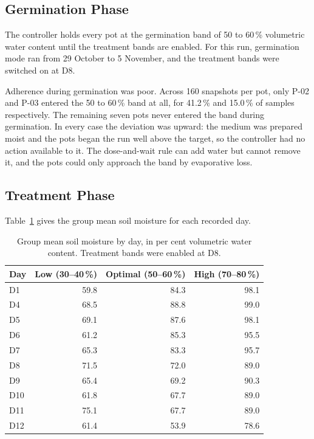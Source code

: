 \subsection{Germination Phase}

The controller holds every pot at the germination band of 50 to 60\,\%
volumetric water content until the treatment bands are enabled. For this run,
germination mode ran from 29 October to 5 November, and the treatment bands
were switched on at D8.

Adherence during germination was poor. Across 160 snapshots per pot, only P-02
and P-03 entered the 50 to 60\,\% band at all, for 41.2\,\% and 15.0\,\% of
samples respectively. The remaining seven pots never entered the band during
germination. In every case the deviation was upward: the medium was prepared
moist and the pots began the run well above the target, so the controller had
no action available to it. The dose-and-wait rule can add water but cannot
remove it, and the pots could only approach the band by evaporative loss.

\subsection{Treatment Phase}

Table~\ref{tab:sm_by_group} gives the group mean soil moisture for each
recorded day.

\begin{table}[ht]
\centering
\caption{Group mean soil moisture by day, in per cent volumetric water
content. Treatment bands were enabled at D8.}
\label{tab:sm_by_group}
\begin{tabular}{lrrr}
\toprule
\textbf{Day} & \textbf{Low (30--40\,\%)} & \textbf{Optimal (50--60\,\%)} & \textbf{High (70--80\,\%)} \\
\midrule
D1  & 59.8 & 84.3 & 98.1 \\
D4  & 68.5 & 88.8 & 99.0 \\
D5  & 69.1 & 87.6 & 98.1 \\
D6  & 61.2 & 85.3 & 95.5 \\
D7  & 65.3 & 83.3 & 95.7 \\
D8  & 71.5 & 72.0 & 89.0 \\
D9  & 65.4 & 69.2 & 90.3 \\
D10 & 61.8 & 67.7 & 89.0 \\
D11 & 75.1 & 67.7 & 89.0 \\
D12 & 61.4 & 53.9 & 78.6 \\
\bottomrule
\end{tabular}
\end{table}

